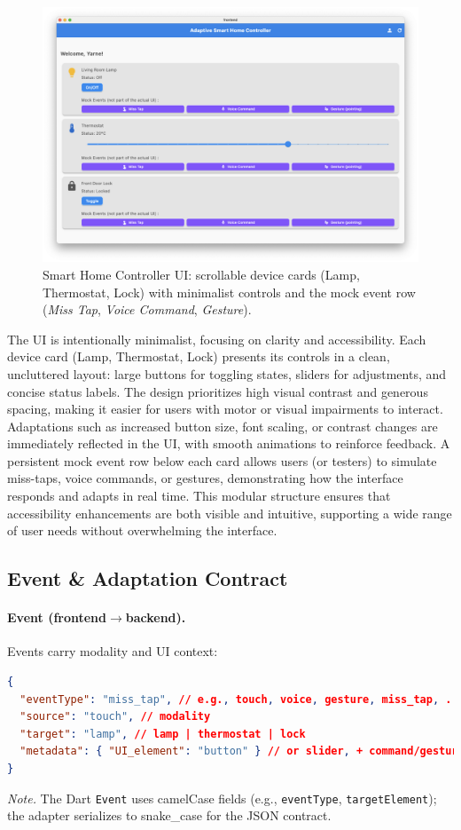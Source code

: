 \begin{figure}[H]
\centering
\includegraphics[width=.9\linewidth]{images/fig_ui_overview.png}
\caption{Smart Home Controller UI: scrollable device cards (Lamp, Thermostat, Lock) with minimalist controls and the mock event row (\emph{Miss Tap}, \emph{Voice Command}, \emph{Gesture}).}
\label{fig:ui_overview}
\end{figure}

The UI is intentionally minimalist, focusing on clarity and accessibility. Each device card (Lamp, Thermostat, Lock) presents its controls in a clean, uncluttered layout: large buttons for toggling states, sliders for adjustments, and concise status labels. The design prioritizes high visual contrast and generous spacing, making it easier for users with motor or visual impairments to interact. Adaptations such as increased button size, font scaling, or contrast changes are immediately reflected in the UI, with smooth animations to reinforce feedback. A persistent mock event row below each card allows users (or testers) to simulate miss-taps, voice commands, or gestures, demonstrating how the interface responds and adapts in real time. This modular structure ensures that accessibility enhancements are both visible and intuitive, supporting a wide range of user needs without overwhelming the interface.

\subsection{Event \& Adaptation Contract}
\label{sec:event_adaptation_contract}
\paragraph{Event (frontend$\rightarrow$backend).} Events carry modality and UI context:
\begin{lstlisting}[language=json, basicstyle=\ttfamily\small, caption={Event structure}]
{
  "eventType": "miss_tap", // e.g., touch, voice, gesture, miss_tap, ...
  "source": "touch", // modality
  "target": "lamp", // lamp | thermostat | lock
  "metadata": { "UI_element": "button" } // or slider, + command/gesture fields
}
\end{lstlisting}
\noindent\emph{Note.} The Dart \texttt{Event} uses camelCase fields (e.g., \texttt{eventType}, \texttt{targetElement}); the adapter serializes to snake\_case for the JSON contract.

